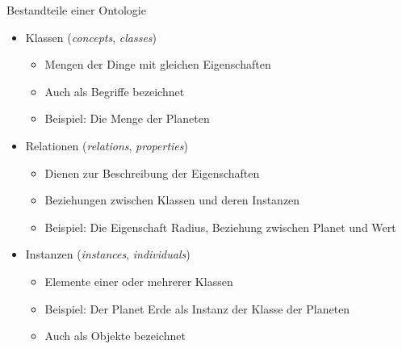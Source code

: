 \documentclass{beamer}
\begin{document}
\begin{frame}{Bestandteile einer Ontologie}
	
	\begin{itemize}
		\item Klassen (\emph{concepts}, \emph{classes})
		\begin{itemize}
			\item Mengen der Dinge mit gleichen Eigenschaften
			\item Auch als Begriffe bezeichnet
			\item Beispiel: Die Menge der Planeten
		\end{itemize}
		\item Relationen (\emph{relations}, \emph{properties})
		\begin{itemize}
			\item Dienen zur Beschreibung der Eigenschaften
			\item Beziehungen zwischen Klassen und deren Instanzen
			\item Beispiel: Die Eigenschaft Radius, Beziehung zwischen Planet und Wert
		\end{itemize}
		\item Instanzen (\emph{instances}, \emph{individuals})
		\begin{itemize}
			\item Elemente einer oder mehrerer Klassen
			\item Beispiel: Der Planet Erde als Instanz der Klasse der Planeten
			\item Auch als Objekte bezeichnet
		\end{itemize}
	\end{itemize}
	
\end{frame}
\end{document}
